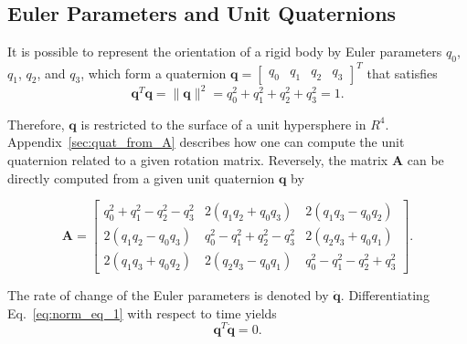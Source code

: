 \documentclass[aip,jcp,reprint,amsmath,amssymb]{revtex4-1}
\newcommand{\mt}[1]{\boldsymbol{\mathbf{#1}}}           %
\newcommand{\vt}[1]{\boldsymbol{\mathbf{#1}}}           %
\newcommand{\tr}[1]{#1^T}                               %
\begin{document}
\subsection{Euler Parameters and Unit Quaternions}

It is possible to represent the orientation of a rigid body by Euler parameters $q_0$, $q_1$, $q_2$, and $q_3$, which form a quaternion $\vt q = \tr {[\begin{array}{cccc} q_0 & q_1 & q_2 & q_3 \end{array}]}$ that satisfies\cite{Goldstein2002}
\begin{equation}
\label{eq:norm_eq_1}
\tr{\vt q}{\vt q} = \|\vt q\|^2 = q_0^2 + q_1^2 + q_2^2 + q_3^2 = 1.
\end{equation}

Therefore, $\vt q$ is restricted to the surface of a unit hypersphere in $R^4$. Appendix~\ref{sec:quat_from_A} describes how one can compute the unit quaternion related to a given rotation matrix. Reversely, the matrix $\mt A$ can be directly computed from a given unit quaternion $\vt q$ by\cite{Allen1989,Miller2002}
\begin{widetext}
\begin{equation}
\label{eq:A_from_q}
\mt A = \left[ \begin{array}{ccc}
q_0^2 + q_1^2 - q_2^2 - q_3^2 & 2(q_1 q_2 + q_0 q_3) & 2(q_1 q_3 - q_0 q_2) \\
2(q_1 q_2 - q_0 q_3) & q_0^2 - q_1^2 + q_2^2 - q_3^2 & 2(q_2 q_3 + q_0 q_1) \\
2(q_1 q_3 + q_0 q_2) & 2(q_2 q_3 - q_0 q_1) & q_0^2 - q_1^2 - q_2^2 + q_3^2  
\end{array} \right].
\end{equation}
\end{widetext}

The rate of change of the Euler parameters is denoted by $\dot{\vt q}$. Differentiating Eq.~\ref{eq:norm_eq_1} with respect to time yields
\begin{equation}
\label{eq:diff_qTq}
\tr{\vt q}\dot{\vt q} = 0.
\end{equation}
\end{document}
